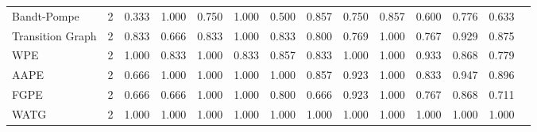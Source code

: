 \documentclass[journal]{IEEEtran}
\begin{document}
\begin{table}
\begin{tabular}{lrrrr*9{r}}
		\cmidrule(lr){1-1}
		\cmidrule(lr){2-2}
		\cmidrule(lr){3-6}
		\cmidrule(lr){7-10}
		\cmidrule(lr){11-11}
		\cmidrule(lr){12-12}
		\cmidrule(lr){13-13}
	 \color{blue}	Bandt-Pompe & 2 & 
	 \color{blue}	0.333 & \color{blue} 1.000 & \color{blue} 0.750 & \color{blue} 1.000 &
	 \color{blue}	0.500 & \color{blue}0.857 & \color{blue} 0.750 &  \color{blue}0.857 &
	 \color{blue}	0.600 & \color{blue} 0.776 & \color{blue} 0.633\\ 
	 \color{blue}	Transition Graph &  \color{blue}2 & 
	 \color{blue}	0.833 &  \color{blue}0.666 &  \color{blue}0.833 & \color{blue} 1.000 &
	 \color{blue}	0.833 & \color{blue} 0.800 & \color{blue} 0.769 &  \color{blue}1.000 &
	 \color{blue}	0.767 &  \color{blue}0.929 & \color{blue} 0.875\\
		\cmidrule(lr){1-1}
		\cmidrule(lr){2-2}
		\cmidrule(lr){3-6}
		\cmidrule(lr){7-10}
		\cmidrule(lr){11-11}
		\cmidrule(lr){12-12}
		\cmidrule(lr){13-13}
	 \color{blue}	WPE &  \color{blue}2 & 
	 \color{blue}	1.000 &  \color{blue}0.833 & \color{blue} 1.000 & \color{blue} 0.833 &
	 \color{blue}	0.857 & \color{blue} 0.833 & \color{blue} 1.000 & \color{blue} 1.000 &
	 \color{blue}	0.933 &  \color{blue}0.868 & \color{blue} 0.779\\ 
	 \color{blue}	AAPE & \color{blue} 2 & 
	 \color{blue}	0.666 &  \color{blue}1.000 &  \color{blue}1.000 &  \color{blue}1.000 &
	 \color{blue}	1.000 &  \color{blue}0.857 &  \color{blue}0.923 &  \color{blue}1.000 &
	 \color{blue}	0.833 &  \color{blue}0.947 & \color{blue} 0.896\\ 
	 \color{blue}	FGPE &  \color{blue}2 & 
	 \color{blue}	0.666 & \color{blue} 0.666 &  \color{blue}1.000 & \color{blue} 1.000 &
	 \color{blue}	0.800 & \color{blue} 0.666 & \color{blue} 0.923 & \color{blue} 1.000 &
	 \color{blue}	0.767 &  \color{blue}0.868 & \color{blue} 0.711\\ 
		\cmidrule(lr){1-1}
		\cmidrule(lr){2-2}
		\cmidrule(lr){3-6}
		\cmidrule(lr){7-10}
		\cmidrule(lr){11-11}
		\cmidrule(lr){12-12}
		\cmidrule(lr){13-13}
	 \color{blue}	WATG &  \color{blue}2 & 
	 \color{blue}	1.000 &  \color{blue}1.000 & \color{blue} 1.000 & \color{blue} 1.000 &
	 \color{blue}	1.000 &  \color{blue}1.000 & \color{blue} 1.000 & \color{blue} 1.000 &
	 \color{blue}	1.000 & \color{blue} 1.000 & \color{blue} 1.000\\
		\bottomrule
	\end{tabular}
\end{table}
\end{document}
